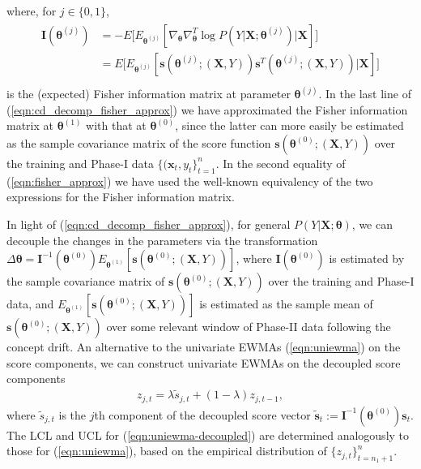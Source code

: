 \documentclass[twoside,11pt]{article}
\begin{document}
where, for $ j\in\{0,1\}$,
\begin{align}
\begin{aligned}
\mathbf {I}(\bm { \theta}^{ (j)}) &= -E \big[ E _{\bm { \theta}^{ (j)}}[\nabla_{\bm { \theta}} \nabla^T _{\bm { \theta}}{ \log{P}(Y|\bm{X};\bm { \theta}^{ (j)})} | \bm {X}] \big]  \\
&= E \big[ E _{\bm { \theta}^{ (j)}}[\bm{s}(\bm { \theta}^{ (j)}; (\bm {X}, Y)) \bm{s}^T(\bm { \theta}^{ (j)}; (\bm {X}, Y)) | \bm {X}] \big]\\
\end{aligned}
\label{eqn:fisher_approx}
\end{align}
is the (expected) Fisher information matrix at parameter $\bm { \theta} ^{ (j)}$. In the last line of (\ref{eqn:cd_decomp_fisher_approx}) we have approximated the Fisher information matrix at $\bm { \theta} ^{ (1)}$ with that at $\bm { \theta} ^{ (0)}$, since the latter can more easily be estimated as the sample covariance matrix of the score function $\bm{s}(\bm { \theta}^{ (0)}; (\bm {X}, Y))$ over the training and Phase-I data $\{(\bm{x}_t,y_t\}_{t=1}^n$. In the second equality of (\ref{eqn:fisher_approx}) we have used the well-known equivalency of the two expressions for the Fisher information matrix. 

In light of (\ref{eqn:cd_decomp_fisher_approx}), for general $P(Y|\bm{X};\bm{\theta})$, we can decouple the changes in the parameters via the transformation $ \Delta \bm { \theta} = \mathbf {I}^{-1}(\bm { \theta}^{ (0)}) E_{\bm{ \theta}^{ (1)}}[\bm{s}(\bm { \theta}^{ (0)}; (\bm {X}, Y))]$, where $\mathbf {I}(\bm { \theta}^{ (0)})$ is estimated by the sample covariance matrix of $\bm{s}(\bm { \theta}^{ (0)}; (\bm {X}, Y))$ over the training and Phase-I data, and $E_{\bm{ \theta}^{ (1)}}[\bm{s}(\bm { \theta}^{ (0)}; (\bm {X}, Y))]$ is estimated as the sample mean of $\bm{s}(\bm { \theta}^{ (0)}; (\bm {X}, Y))$ over some relevant window of Phase-II data following the concept drift. An alternative to the univariate EWMAs (\ref{eqn:uniewma}) on the score components, we can construct univariate EWMAs on the decoupled score components
\begin{align}
z_{j,t} = \lambda \tilde{s}_{j,t} + (1 - \lambda) z_{j,t-1},
\label{eqn:uniewma-decoupled}
\end{align}
where $\tilde{s}_{j,t}$ is the $j$th component of the decoupled score vector $\tilde{\bm{s}}_t := \mathbf {I}^{-1}(\bm { \theta}^{ (0)})\bm{s}_t$. The LCL and UCL for (\ref{eqn:uniewma-decoupled}) are determined analogously to those for (\ref{eqn:uniewma}), based on the empirical distribution of $\{z_{j,t}\}_{t=n_1+1}^n$.  
\end{document}
